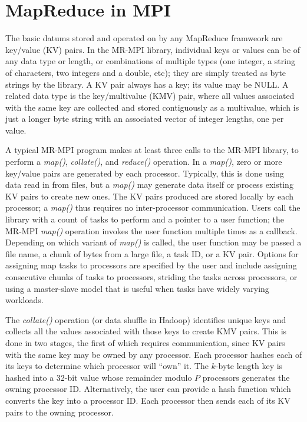 \section{MapReduce in MPI}
\label{sec:mr}

The basic datums stored and operated on by any MapReduce framweork are
key/value (KV) pairs.  In the MR-MPI library, individual keys or
values can be of any data type or length, or combinations of multiple
types (one integer, a string of characters, two integers and a double,
etc); they are simply treated as byte strings by the library.  A KV
pair always has a key; its value may be NULL.  A related data type is
the key/multivalue (KMV) pair, where all values associated with the
same key are collected and stored contiguously as a multivalue, which
is just a longer byte string with an associated vector of integer
lengths, one per value.

A typical MR-MPI program makes at least three calls to the MR-MPI library,
to perform a {\it map()}, {\it collate()}, and {\it reduce()}
operation.  In a {\it map()}, zero or more key/value pairs are
generated by each processor.  Typically, this is done using data read
in from files, but a {\it map()} may generate data itself or process
existing KV pairs to create new ones.  The KV pairs produced are
stored locally by each processor; a {\it map()} thus requires no
inter-processor communication.  Users call the library with a count of
tasks to perform and a pointer to a user function; the MR-MPI {\it
map()} operation invokes the user function multiple times as a
callback.  Depending on which variant of {\it map()} is called, the
user function may be passed a file name, a chunk of bytes from a large
file, a task ID, or a KV pair.  Options for assigning map tasks to processors
are specified by the user and include assigning consecutive 
chunks of tasks to processors, striding the tasks across processors,
or using a master-slave model that is useful when tasks have widely
varying workloads.

The {\it collate()} operation (or data shuffle in Hadoop) identifies
unique keys and collects all the values associated with those keys to
create KMV pairs.  This is done in two stages, the first of which
requires communication, since KV pairs with the same key may be owned
by any processor.  Each processor hashes each of its keys to determine
which processor will ``own'' it.  The $k$-byte length key is hashed into
a 32-bit value whose remainder modulo $P$ processors generates the owning
processor ID.  Alternatively, the user can provide a hash function
which converts the key into a processor ID.  Each processor then sends
each of its KV pairs to the owning processor.

